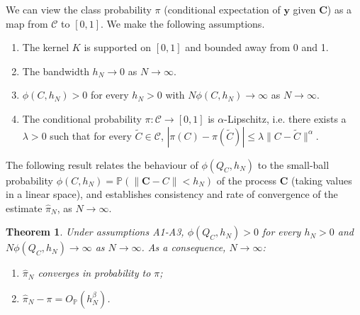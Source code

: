 \documentclass[11pt]{amsart}
\newtheorem{theorem}{Theorem}
\theoremstyle{definition}
\begin{document}
We can view the class probability $\pi$ (conditional expectation of $\mathbf{y}$ given $\mathbf{C}$) as a map from $\mathcal{C}$ to $[0,1]$. 
We make the following assumptions. 
\begin{enumerate}[\text{A}1.]
\item The kernel $K$ is supported on $[0,1]$ and bounded away from 0 and 1.
\item The bandwidth $h_N \to 0$ as $N \to \infty$.
\item $\phi(C,h_N)>0$ for every $h_N >0$ with $N\phi(C,h_N)\to \infty$ as $N\to \infty$.
\item The conditional probability $\pi:\mathcal{C} \to [0,1]$ is $\alpha$-Lipschitz, i.e. there exists a $\lambda>0$ such that for every $\tilde{C} \in \mathcal{C}$, $|\pi(C)-\pi(\tilde{C})|\leq \lambda \|C-\tilde{C}\|^\alpha$.
\end{enumerate}
The following result relates the behaviour of $\phi(Q_C,h_N)$ to the small-ball probability $\phi(C,h_N)=\mathbb{P}(\|\mathbf{C}-C\|<h_N)$ of the process $\mathbf{C}$ (taking values in a linear space), and establishes consistency and rate of convergence of the estimate $\hat{\pi}_N$, as $N\to \infty$. 
\begin{theorem}
\label{th1}
 Under assumptions A1-A3, $\phi(Q_C,h_N)>0$ for every $h_N>0$ and $N\phi(Q_C,h_N)\to \infty$ as $N\to \infty$. As a consequence, $N \to \infty$:
 \begin{enumerate}[1.]
\item  $\hat{\pi}_N$ converges in probability to $\pi$;
\item $\hat{\pi}_N-\pi=O_\mathbb{P}(h^\beta_N)$.
 \end{enumerate}
\end{theorem}
\end{document}
